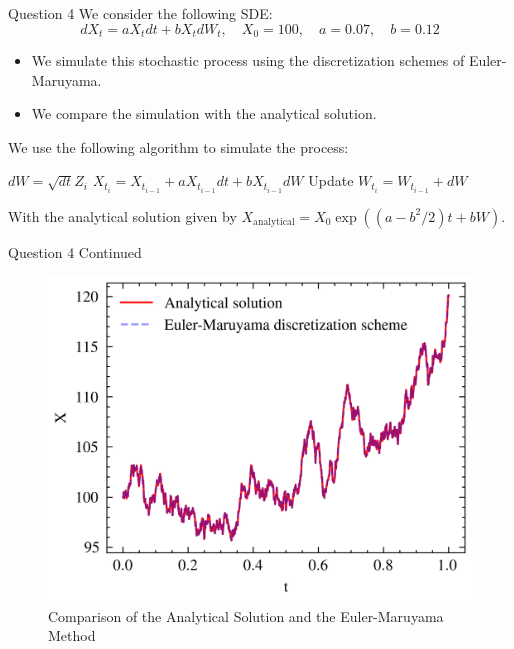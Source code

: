 \documentclass[compress,12pt]{beamer}
\begin{document}
\begin{frame}{Question 4}
    We consider the following SDE:
    \begin{equation*}
        dX_t = aX_t dt + bX_t dW_t, \quad X_0 = 100, \quad a = 0.07, \quad b = 0.12
    \end{equation*}

    \begin{itemize}
        \item We simulate this stochastic process using the discretization schemes of Euler-Maruyama.
        \item We compare the simulation with the analytical solution.
    \end{itemize}

    We use the following algorithm to simulate the process:
     
    \begin{algorithmic}
            \State $dW = \sqrt{dt} Z_i$
            \State $X_{t_i} = X_{t_{i-1}} + aX_{t_{i-1}} dt + bX_{t_{i-1}} dW$
            \State Update $W_{t_i} = W_{t_{i-1}} + dW$
        \EndFor
    \end{algorithmic}

    With the analytical solution given by $X_{\text{analytical}} = X_0 \exp((a - b^2/2)t + bW)$.
\end{frame}

\begin{frame}{Question 4 Continued}
    \begin{figure}
        \centering
        \includegraphics{imgs/eulermaruyama.png}
        \caption{Comparison of the Analytical Solution and the Euler-Maruyama Method}
    \end{figure}
\end{frame}
\end{document}
